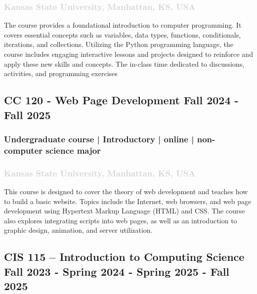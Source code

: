 \documentclass[11pt]{article}
\begin{document}
  \subsubsection{ \normalfont \textcolor{lightgray}{Kansas State University, Manhattan, KS, USA   }}
     \vspace{0.2em} %
   \noindent
The course provides a foundational introduction to computer programming. It covers essential concepts such as variables, data types, functions, conditionals, iterations, and collections. Utilizing the Python programming language, the course includes engaging interactive lessons and projects designed to reinforce and apply these new skills and concepts. The in-class time dedicated to discussions, activities, and programming exercises

\label{sec:CC120} 
   \vspace{0.8em} %

  \subsection{ CC 120 - Web Page Development  \hfill \normalfont  Fall 2024  - Fall 2025}
 \subsubsection{ Undergraduate course | Introductory | online | non-computer science major   }
  \subsubsection{ \normalfont \textcolor{lightgray}{Kansas State University, Manhattan, KS, USA   }}
    \vspace{0.4em} %
     \noindent
This course is designed to cover the theory of web development and teaches how to build a basic website. Topics include the Internet, web browsers, and web page development using Hypertext Markup Language (HTML) and CSS. The course also explores integrating scripts into web pages, as well as an introduction to graphic design, animation, and server utilization. 


\label{sec:CIS115} 
   \vspace{0.8em} %
   
   \subsection{ CIS 115 – Introduction to Computing Science  \hfill \normalfont Fall 2023 - Spring 2024 - Spring 2025  - Fall 2025}
\end{document}
